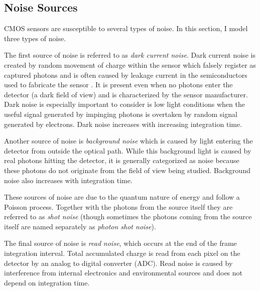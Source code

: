 \documentclass[tocnosub,noragright,centerchapter,12pt]{uiucecethesis09}
\begin{document}
\subsection{Noise Sources} \label{sec:noise}

CMOS sensors are susceptible to several types of noise.  In this section, I model three types of noise.

The first source of noise is referred to as \emph{dark current noise}.  Dark current noise is created by random movement of charge within the sensor which falsely register as captured photons and is often caused by leakage current in the semiconductors used to fabricate the sensor \cite{dark}.  It is present even when no photons enter the detector (a dark field of view) and is characterized by the sensor manufacturer.  Dark noise is especially important to consider is low light conditions when the useful signal generated by impinging photons is overtaken by random signal generated by electrons.  Dark noise increases with increasing integration time.

Another source of noise is \emph{background noise} which is caused by light entering the detector from outside the optical path.  While this background light is caused by real photons hitting the detector, it is generally categorized as noise because these photons do not originate from the field of view being studied.  Background noise also increases with integration time.

These sources of noise are due to the quantum nature of energy and follow a Poisson process.  Together with the photons from the source itself they are referred to as \emph{shot noise} (though sometimes the photons coming from the source itself are named separately as \emph{photon shot noise}).

The final source of noise is \emph{read noise}, which occurs at the end of the frame integration interval.  Total accumulated charge is read from each pixel on the detector by an analog to digital converter (ADC).  Read noise is caused by interference from internal electronics and environmental sources and does not depend on integration time.
\end{document}
